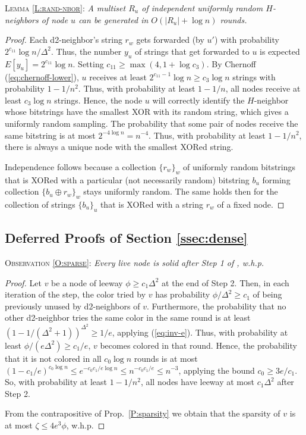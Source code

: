 \textsc{Lemma \ref{L:rand-nbor}:}
\emph{A multiset $R_u$ of independent uniformly random $H$-neighbors of node $u$ can be generated in $O(|R_u|+\log n)$ rounds.}
\begin{proof}
Each d2-neighbor's string $r_w$ gets forwarded (by $u'$) with probability $2^{c_{11}}\log n / \Delta^2$. Thus, the number  $y_{u}$ of strings that get forwarded to $u$ is expected $E[y_u] = 2^{c_{11}} \log n$. Setting $c_{11} \ge \max(4, 1+\log c_3)$.
By Chernoff (\ref{eq:chernoff-lower}), $u$ receives at least $2^{c_{11}-1} \log n \ge c_3 \log n$ strings with probability $1-1/n^2$.
Thus, with probability at least $1-1/n$, all nodes receive at least $c_3 \log n$ strings.
Hence, the node $u$ will correctly identify the $H$-neighbor whose bitstrings have the smallest XOR with its random string, which gives a uniformly random sampling.
The probability that some pair of nodes receive the same bitstring is at most $2^{-4\log n} = n^{-4}$. Thus, with probability at least $1-1/n^2$, there is always a unique node with the smallest XORed string.

Independence follows because a collection $\{r_w\}_w$ of uniformly random bitstrings that is XORed with a particular (not necessarily random) bitstring $b_u$ forming collection $\{ b_u \oplus r_w\}_w$ stays uniformly random.
The same holds then for the collection of strings $\{b_u\}_u$
that is XORed with a string $r_w$ of a fixed node.
\end{proof}



\subsection{Deferred Proofs of Section \ref{ssec:dense}}
\label{app:struct}
\textsc{Observation \ref{O:sparse}:} \emph{
Every live node is solid after Step 1 of , w.h.p.}
\begin{proof}
Let $v$ be a node of leeway $\phi \ge c_1 \Delta^2$ at the end of Step 2.
Then, in each iteration of the step, the color tried by $v$ has probability $\phi/\Delta^2 \ge c_1$ of being previously unused by d2-neighbors of $v$. Furthermore, the probability that no other d2-neighbor tries the same color in the same round is at least $(1-1/(\Delta^2+1))^{\Delta^2} \ge 1/e$, applying (\ref{eq:inv-e}). Thus,
with probability at least $\phi/(e \Delta^2) \ge c_1/e$, $v$ becomes colored in that round. Hence, the probability that it is not colored in all $c_0 \log n$ rounds is at most $(1-c_1/e)^{c_0\log n} \le e^{-c_0 c_1/e \log n} \le n^{-c_0 c_1/e} \le n^{-3}$, applying the bound $c_0 \ge 3e/c_1$.
So, with probability at least $1-1/n^2$, all nodes have leeway at most $c_1 \Delta^2$ after Step 2.

From the contrapositive of Prop.~\ref{P:sparsity} we obtain that the sparsity of $v$ is at most $\zeta \le 4e^3 \phi$, w.h.p.
\end{proof}


